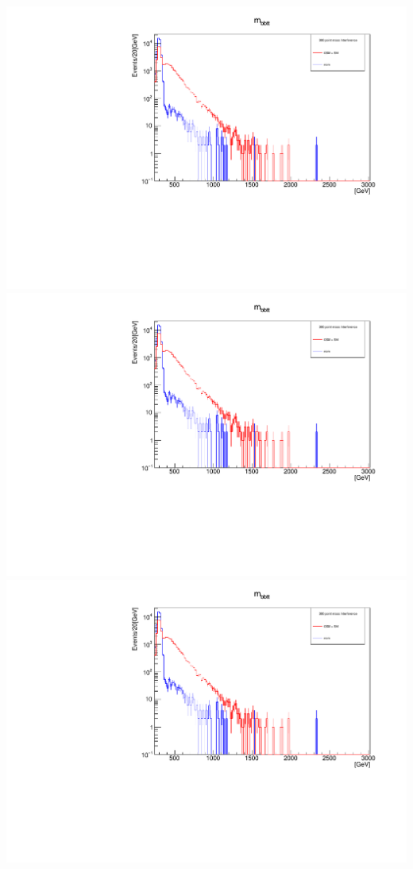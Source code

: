 \documentclass[a4wide,10pt]{article}
\begin{document}
\includegraphics[scale=0.50,page=1]{InterferencePlots02p.pdf}
\includegraphics[scale=0.50,page=2]{InterferencePlots02p.pdf}
\includegraphics[scale=0.50,page=3]{InterferencePlots02p.pdf}
\end{document}
